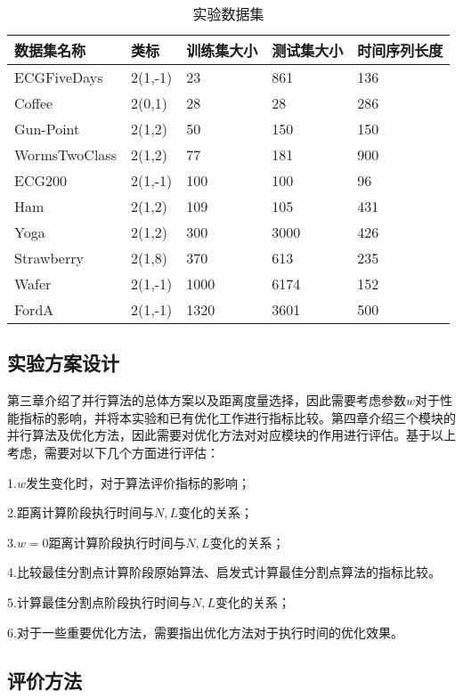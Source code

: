\begin{table}[htbp]
	\centering
	\begin{minipage}{0.9\textwidth}
		\caption{实验数据集}
		\label{tab:dataset}
		\begin{tabular}{p{3cm}p{2cm}p{2cm}p{2cm}p{2.5cm}}
			\toprule[1.5pt]
			{\heiti 数据集名称} &{\heiti 类标 } & {\heiti 训练集大小} &{\heiti 测试集大小} &{\heiti 时间序列长度}\\\midrule[1pt]
			ECGFiveDays &2(1,-1) &23 &861 &136\\
			Coffee  &2(0,1) &28 &28 &286 \\
			Gun-Point    &2(1,2)&50&150&150\\
			WormsTwoClass&2(1,2)&77&181&900\\
			ECG200          &2(1,-1)&100&100&96\\
			Ham          &2(1,2)&109&105&431\\
			Yoga         &2(1,2)&300&3000&426\\
			Strawberry   &2(1,8)&370&613&235\\
			Wafer        &2(1,-1)&1000&6174&152\\
			FordA &2(1,-1) &1320 &3601 &500 \\
			\bottomrule[1.5pt]
		\end{tabular}
	\end{minipage}
\end{table}

\subsection{实验方案设计}
第三章介绍了并行算法的总体方案以及距离度量选择，因此需要考虑参数$w$对于性能指标的影响，并将本实验和已有优化工作进行指标比较。第四章介绍三个模块的并行算法及优化方法，因此需要对优化方法对对应模块的作用进行评估。基于以上考虑，需要对以下几个方面进行评估：

1.$w$发生变化时，对于算法评价指标的影响；

2.距离计算阶段执行时间与$N,L$变化的关系；

3.$w=0$距离计算阶段执行时间与$N,L$变化的关系；

4.比较最佳分割点计算阶段原始算法、启发式计算最佳分割点算法的指标比较。

5.计算最佳分割点阶段执行时间与$N,L$变化的关系；

6.对于一些重要优化方法，需要指出优化方法对于执行时间的优化效果。
\subsection{评价方法}

